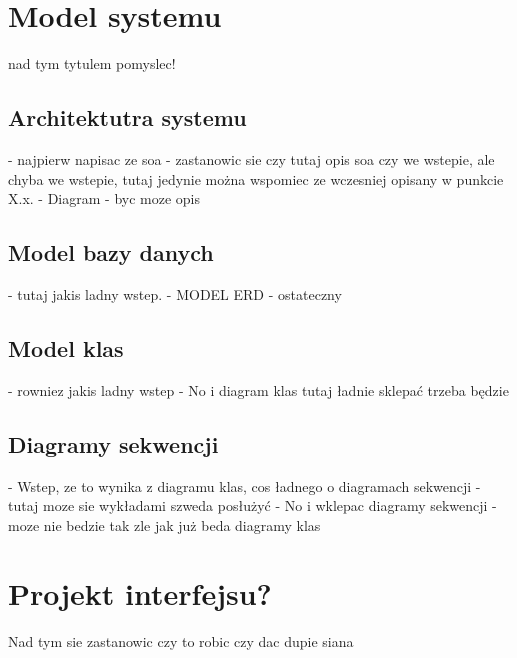\section{Model systemu}
nad tym tytulem pomyslec!\newline
\subsection{Architektutra systemu}
- najpierw napisac ze soa\newline
- zastanowic sie czy tutaj opis soa czy we wstepie, ale chyba we wstepie, tutaj jedynie można wspomiec ze wczesniej opisany w punkcie X.x.\newline
- Diagram \newline
- byc moze opis

\subsection{Model bazy danych}
- tutaj jakis ladny wstep.\newline
- MODEL ERD - ostateczny \newline

\subsection{Model klas}
- rowniez jakis ladny wstep \newline
- No i diagram klas tutaj ładnie sklepać trzeba będzie \newline

\subsection{Diagramy sekwencji}
- Wstep, ze to wynika z diagramu klas, cos ładnego o diagramach sekwencji - tutaj moze sie wykładami szweda posłużyć \newline
- No i wklepac diagramy sekwencji - moze nie bedzie tak zle jak już beda diagramy klas \newline
\section {Projekt interfejsu?}
Nad tym sie zastanowic czy to robic czy dac dupie siana

